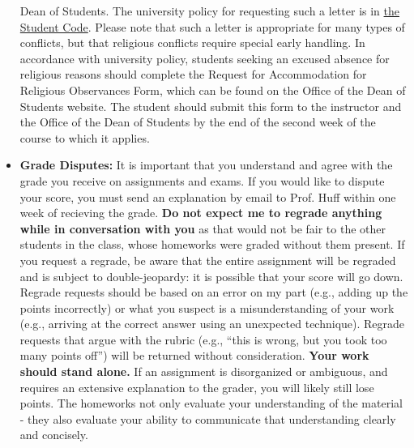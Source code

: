 \documentclass[11pt]{article}
\begin{document}
\begin{itemize}
                Dean of Students.  The university policy for requesting such a 
                letter is in 
                \href{http://studentcode.illinois.edu/article1_part5_1-501.html}{the 
                Student Code}. Please note that such a letter is appropriate 
                for many types of conflicts, but that religious conflicts 
                require special early handling. In accordance with university 
                policy, students seeking an excused absence for religious 
                reasons should complete the Request for Accommodation for 
                Religious Observances Form, which can be found on the Office of 
                the Dean of Students website. The student should submit this 
                form to the instructor and the Office of the Dean of Students 
                by the end of the second week of the course to which it 
                applies. 

\item[] \textbf{Grade Disputes:} It is important that you understand and agree
        with the grade you receive on assignments and exams. If you would like
        to dispute your score, you must send an explanation by email to Prof.
        Huff within one week of recieving the grade.
        \textbf{Do not expect me to regrade anything while in conversation with
        you} as that would not be fair to the other students in the class, whose
        homeworks were graded without them present.  If you request a regrade,
        be aware that the entire assignment will be regraded and is subject to
        double-jeopardy: it is possible that your score will go down.
        Regrade requests should be based on an error on my part (e.g., adding
        up the points incorrectly) or what you suspect is a misunderstanding of
        your work (e.g., arriving at the correct answer using an unexpected
        technique). Regrade requests that argue with the rubric (e.g., ``this is
        wrong, but you took too many points off'') will be returned without
        consideration.
        \textbf{Your work should stand alone.} If an assignment is disorganized or
        ambiguous, and requires an extensive explanation to the grader, you
        will likely still lose points. The homeworks not only evaluate your
        understanding of the material - they also evaluate your ability to
        communicate that understanding clearly and concisely.

\end{itemize}
\end{document}
